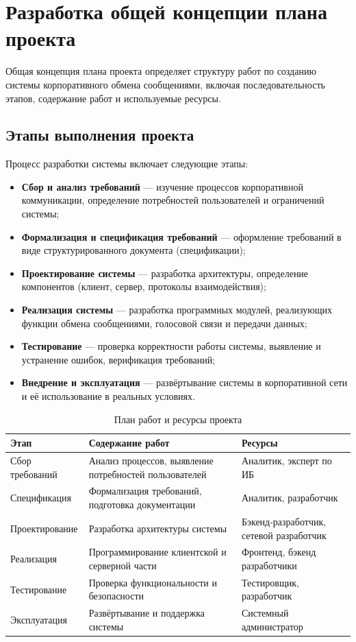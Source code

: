 \documentclass[14pt,a4paper]{extarticle}
\begin{document}
\section{Разработка общей концепции плана проекта}

Общая концепция плана проекта определяет структуру работ по созданию системы корпоративного обмена сообщениями, включая последовательность этапов, содержание работ и используемые ресурсы.

\subsection{Этапы выполнения проекта}

Процесс разработки системы включает следующие этапы:

\begin{itemize}
\item \textbf{Сбор и анализ требований} — изучение процессов корпоративной коммуникации, определение потребностей пользователей и ограничений системы;
\item \textbf{Формализация и спецификация требований} — оформление требований в виде структурированного документа (спецификации);
\item \textbf{Проектирование системы} — разработка архитектуры, определение компонентов (клиент, сервер, протоколы взаимодействия);
\item \textbf{Реализация системы} — разработка программных модулей, реализующих функции обмена сообщениями, голосовой связи и передачи данных;
\item \textbf{Тестирование} — проверка корректности работы системы, выявление и устранение ошибок, верификация требований;
\item \textbf{Внедрение и эксплуатация} — развёртывание системы в корпоративной сети и её использование в реальных условиях.
\end{itemize}

\begin{table}[h!]
\centering
\begin{tabular}{|p{5cm}|p{5cm}|p{4cm}|} \\
\hline
\textbf{Этап} & \textbf{Содержание работ} & \textbf{Ресурсы} \\
\hline
Сбор требований & Анализ процессов, выявление потребностей пользователей & Аналитик, эксперт по ИБ \\
\hline
Спецификация & Формализация требований, подготовка документации & Аналитик, разработчик \\
\hline
Проектирование & Разработка архитектуры системы & Бэкенд-разработчик, сетевой разработчик \\
\hline
Реализация & Программирование клиентской и серверной части & Фронтенд, бэкенд разработчики \\
\hline
Тестирование & Проверка функциональности и безопасности & Тестировщик, разработчик \\
\hline
Эксплуатация & Развёртывание и поддержка системы & Системный администратор \\
\hline
\end{tabular}
\caption{План работ и ресурсы проекта}
\end{table}
\end{document}
